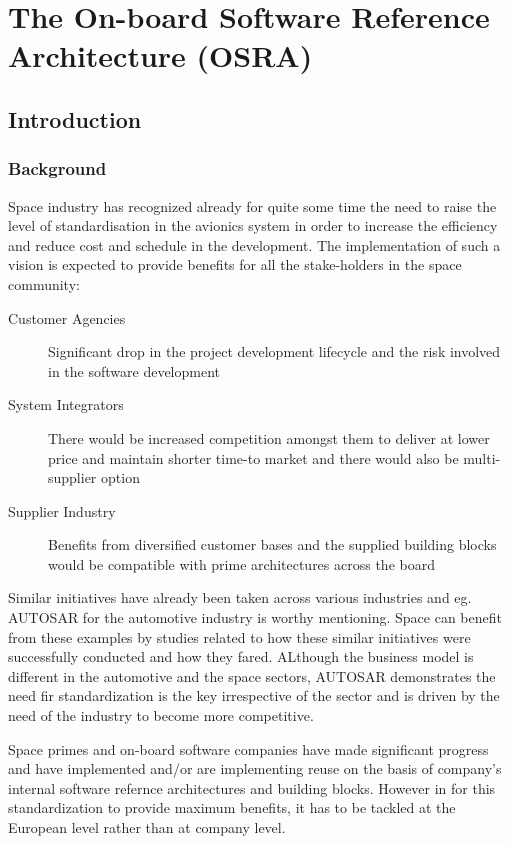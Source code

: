 
\chapter{The On-board Software Reference Architecture (OSRA)}
\label{chap:OSRA}
\section{Introduction}
\subsection{Background}
Space industry has recognized already for quite some time the need to raise the level of standardisation in the avionics system in order to increase the efficiency and reduce cost and schedule in the development.
The implementation of such a vision is expected to provide benefits for all the stake-holders in the space community:

\begin{description}
\item  [Customer Agencies] Significant drop in the project development lifecycle and the risk involved in the software development
\item [System Integrators] There would be increased competition amongst them to deliver at lower price and maintain shorter time-to market and there would also be multi-supplier option
\item [Supplier Industry] Benefits from diversified customer bases and the supplied building blocks would be compatible with prime architectures across the board
\end{description}

Similar initiatives have already been taken across various industries and eg. AUTOSAR for the automotive industry is worthy mentioning. Space can benefit from these examples by studies related to how these similar initiatives were successfully conducted and how they fared. ALthough the business model is different in the automotive and the space sectors, AUTOSAR demonstrates the need fir standardization is the key irrespective of the sector and is driven by the need of the industry to become more competitive.

Space primes and on-board software companies have made significant progress and have implemented and/or are implementing reuse on the basis of company's internal software refernce architectures and building blocks. However in for this standardization to provide maximum benefits, it has to be tackled at the European level rather than at company level.

